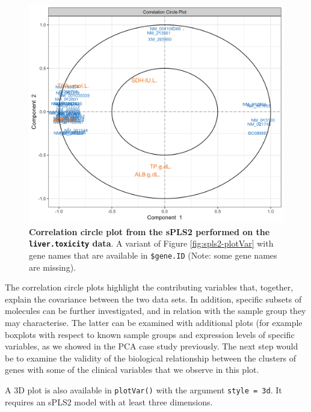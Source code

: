 \documentclass[]{book}
\newenvironment{Shaded}{\begin{snugshade}}{\end{snugshade}}
\newcommand{\DataTypeTok}[1]{\textcolor[rgb]{0.13,0.29,0.53}{#1}}
\newcommand{\DecValTok}[1]{\textcolor[rgb]{0.00,0.00,0.81}{#1}}
\newcommand{\KeywordTok}[1]{\textcolor[rgb]{0.13,0.29,0.53}{\textbf{#1}}}
\newcommand{\NormalTok}[1]{#1}
\newcommand{\OperatorTok}[1]{\textcolor[rgb]{0.81,0.36,0.00}{\textbf{#1}}}
\newcommand{\OtherTok}[1]{\textcolor[rgb]{0.56,0.35,0.01}{#1}}
\newcommand{\StringTok}[1]{\textcolor[rgb]{0.31,0.60,0.02}{#1}}
\begin{document}
\begin{Shaded}
\end{Shaded}

\begin{figure}

{\centering \includegraphics[width=0.5\linewidth]{Figures/PLS/spls2-plotVar2-1} 

}

\caption{\textbf{Correlation circle plot from the sPLS2 performed on the \texttt{liver.toxicity} data}. A variant of Figure \ref{fig:spls2-plotVar} with gene names that are available in \texttt{\$gene.ID} (Note: some gene names are missing).}\label{fig:spls2-plotVar2}
\end{figure}



The correlation circle plots highlight the contributing variables that, together, explain the covariance between the two data sets. In addition, specific subsets of molecules can be further investigated, and in relation with the sample group they may characterise. The latter can be examined with additional plots (for example boxplots with respect to known sample groups and expression levels of specific variables, as we showed in the PCA case study previously. The next step would be to examine the validity of the biological relationship between the clusters of genes with some of the clinical variables that we observe in this plot.

A 3D plot is also available in \texttt{plotVar()} with the argument \texttt{style\ =\ \textquotesingle{}3d\textquotesingle{}}. It requires an sPLS2 model with at least three dimensions.
\end{document}
